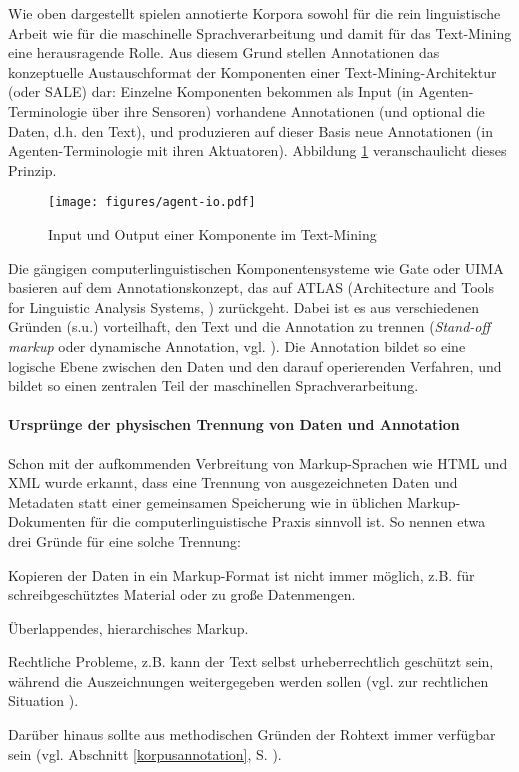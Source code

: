 \documentclass[abstracton, 12pt]{scrartcl}
\begin{document}
Wie oben dargestellt spielen annotierte Korpora sowohl für die rein linguistische Arbeit wie für die maschinelle Sprachverarbeitung und damit für das Text-Mining eine herausragende Rolle. Aus diesem Grund stellen Annotationen das konzeptuelle Austauschformat der Komponenten einer Text-Mining-Architektur (oder SALE) dar: Einzelne Komponenten bekommen als Input (in Agenten-Terminologie über ihre Sensoren) vorhandene Annotationen (und optional die Daten, d.h. den Text), und produzieren auf dieser Basis neue Annotationen (in Agenten-Terminologie mit ihren Aktuatoren). Abbildung \ref{agent-io} veranschaulicht dieses Prinzip.

\begin{figure}
\begin{center}
  \texttt{[image: figures/agent-io.pdf]}
  \caption{Input und Output einer Komponente im Text-Mining} \label{agent-io}
\end{center}
\end{figure}

Die gängigen computerlinguistischen Komponentensysteme wie Gate oder UIMA basieren auf dem Annotationskonzept, das auf ATLAS (Architecture and Tools for Linguistic Analysis Systems, \citealt{BirdAndLiberman1999}) zurückgeht. Dabei ist es aus verschiedenen Gründen (s.u.) vorteilhaft, den Text und die Annotation zu trennen (\emph{Stand-off markup} oder dynamische Annotation, vgl. \citealt{BendenAndHermes2004}). Die Annotation bildet so eine logische Ebene zwischen den Daten und den darauf operierenden Verfahren, und bildet so einen zentralen Teil der maschinellen Sprachverarbeitung.

\paragraph{Ursprünge der physischen Trennung von Daten und Annotation}

Schon mit der aufkommenden Verbreitung von Markup-Sprachen wie HTML und XML wurde erkannt, dass eine Trennung von ausgezeichneten Daten und Metadaten statt einer gemeinsamen Speicherung wie in üblichen Markup-Dokumenten für die computerlinguistische Praxis sinnvoll ist. So nennen etwa \citet{ThompsonAndMcKelvie1997} drei Gründe für eine solche Trennung: \begin{inparaenum} 
    \item Kopieren der Daten in ein Markup-Format ist nicht immer möglich, z.B. für schreibgeschütztes Material oder zu große Datenmengen.
    \item Überlappendes, hierarchisches Markup.
    \item Rechtliche Probleme, z.B. kann der Text selbst urheberrechtlich geschützt sein, während die Auszeichnungen weitergegeben werden sollen (vgl. zur rechtlichen Situation \citealt{HermesAndBenden2005}).
\end{inparaenum} Darüber hinaus sollte aus methodischen Gründen der Rohtext immer verfügbar sein (vgl. Abschnitt \ref{korpusannotation}, S. \pageref{korpusannotation}).
\end{document}
